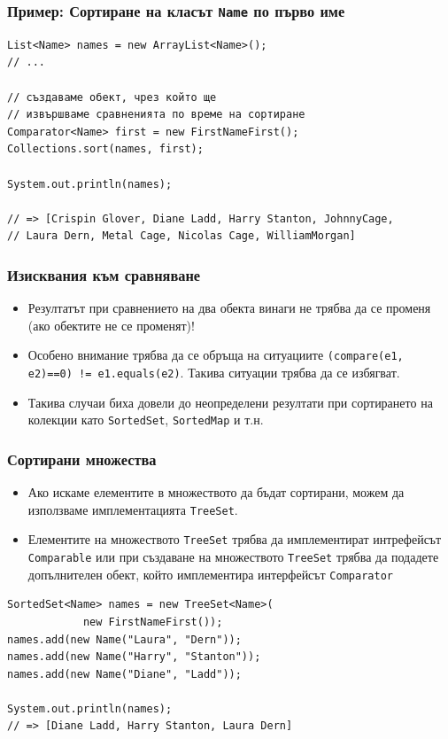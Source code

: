 \documentclass[ignorenonframetext, hyperref=unicode,compress]{beamer}
\begin{document}
\begin{frame}[containsverbatim]\frametitle{Пример: Сортиране на класът \lstinline{Name} по първо име}
\begin{lstlisting}
List<Name> names = new ArrayList<Name>();
// ...

// създаваме обект, чрез който ще
// извършваме сравненията по време на сортиране
Comparator<Name> first = new FirstNameFirst();
Collections.sort(names, first);

System.out.println(names);

// => [Crispin Glover, Diane Ladd, Harry Stanton, JohnnyCage, 
// Laura Dern, Metal Cage, Nicolas Cage, WilliamMorgan]
\end{lstlisting}
\end{frame}

\begin{frame}[containsverbatim]\frametitle{Изисквания към сравняване}
\begin{itemize}
\item Резултатът при сравнението на два обекта винаги не трябва да се променя (ако обектите не се променят)!
\item Особено внимание трябва да се обръща на ситуациите \lstinline{(compare(e1, e2)==0) != e1.equals(e2)}. Такива ситуации трябва да се избягват.
\item Такива случаи биха довели до неопределени резултати при сортирането на колекции като \lstinline{SortedSet}, \lstinline{SortedMap} и т.н.
\end{itemize}
\end{frame}

\begin{frame}[containsverbatim]\frametitle{Сортирани множества}
\begin{itemize}
\item Ако искаме елементите в множеството да бъдат сортирани, можем да използваме имплементацията \lstinline{TreeSet}.
\item Елементите на множеството \lstinline{TreeSet} трябва да имплементират интрефейсът \lstinline{Comparable} или при създаване на множеството \lstinline{TreeSet} трябва да подадете допълнителен обект, който имплементира интерфейсът \lstinline{Comparator}
\end{itemize}
\begin{lstlisting}
SortedSet<Name> names = new TreeSet<Name>(
			new FirstNameFirst());
names.add(new Name("Laura", "Dern"));
names.add(new Name("Harry", "Stanton"));
names.add(new Name("Diane", "Ladd"));

System.out.println(names);
// => [Diane Ladd, Harry Stanton, Laura Dern]
\end{lstlisting}
\end{frame}
\end{document}
